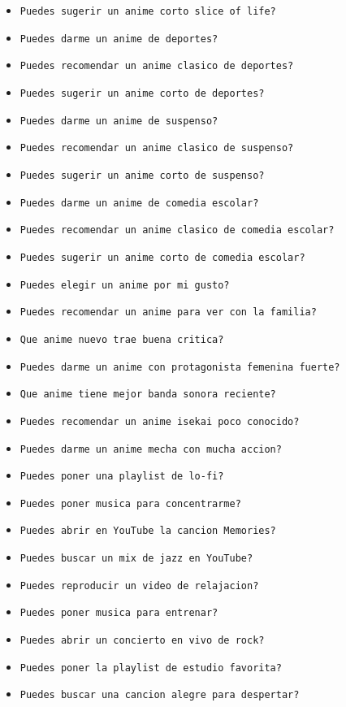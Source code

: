 \documentclass[a4paper,12pt]{article}
\begin{document}
\begin{itemize}
    \item \texttt{Puedes sugerir un anime corto slice of life?}
    \item \texttt{Puedes darme un anime de deportes?}
    \item \texttt{Puedes recomendar un anime clasico de deportes?}
    \item \texttt{Puedes sugerir un anime corto de deportes?}
    \item \texttt{Puedes darme un anime de suspenso?}
    \item \texttt{Puedes recomendar un anime clasico de suspenso?}
    \item \texttt{Puedes sugerir un anime corto de suspenso?}
    \item \texttt{Puedes darme un anime de comedia escolar?}
    \item \texttt{Puedes recomendar un anime clasico de comedia escolar?}
    \item \texttt{Puedes sugerir un anime corto de comedia escolar?}
    \item \texttt{Puedes elegir un anime por mi gusto?}
    \item \texttt{Puedes recomendar un anime para ver con la familia?}
    \item \texttt{Que anime nuevo trae buena critica?}
    \item \texttt{Puedes darme un anime con protagonista femenina fuerte?}
    \item \texttt{Que anime tiene mejor banda sonora reciente?}
    \item \texttt{Puedes recomendar un anime isekai poco conocido?}
    \item \texttt{Puedes darme un anime mecha con mucha accion?}
    \item \texttt{Puedes poner una playlist de lo-fi?}
    \item \texttt{Puedes poner musica para concentrarme?}
    \item \texttt{Puedes abrir en YouTube la cancion Memories?}
    \item \texttt{Puedes buscar un mix de jazz en YouTube?}
    \item \texttt{Puedes reproducir un video de relajacion?}
    \item \texttt{Puedes poner musica para entrenar?}
    \item \texttt{Puedes abrir un concierto en vivo de rock?}
    \item \texttt{Puedes poner la playlist de estudio favorita?}
    \item \texttt{Puedes buscar una cancion alegre para despertar?}

\end{itemize}
\end{document}
